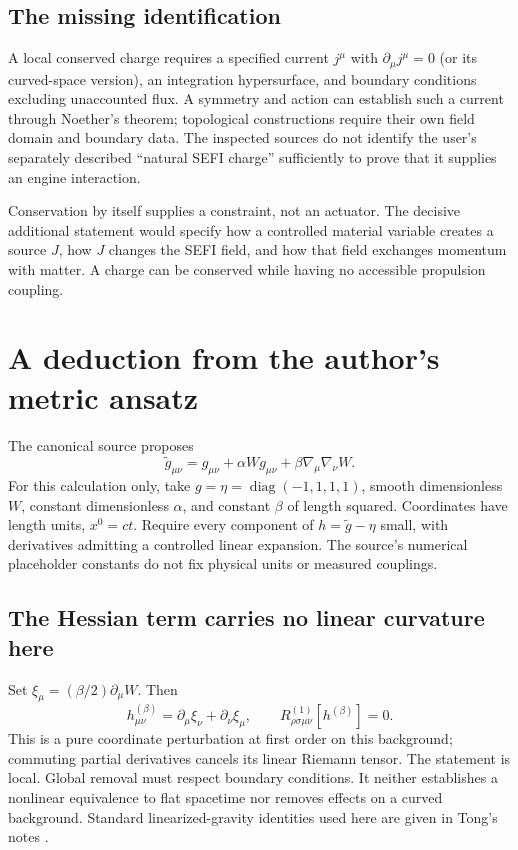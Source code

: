 \documentclass[11pt]{article}
\begin{document}
\subsection{The missing identification}
A local conserved charge requires a specified current $j^\mu$ with $\partial_\mu j^\mu=0$ (or its curved-space version), an integration hypersurface, and boundary conditions excluding unaccounted flux. A symmetry and action can establish such a current through Noether's theorem; topological constructions require their own field domain and boundary data. The inspected sources do not identify the user's separately described ``natural SEFI charge'' sufficiently to prove that it supplies an engine interaction.

Conservation by itself supplies a constraint, not an actuator. The decisive additional statement would specify how a controlled material variable creates a source $J$, how $J$ changes the SEFI field, and how that field exchanges momentum with matter. A charge can be conserved while having no accessible propulsion coupling.
\newpage
\section{A deduction from the author's metric ansatz}
The canonical source proposes
\begin{equation}
 \widetilde g_{\mu\nu}=g_{\mu\nu}+\alpha W g_{\mu\nu}
                  +\beta\nabla_\mu\nabla_\nu W.
 \label{metric}
\end{equation}
For this calculation only, take $g=\eta=\operatorname{diag}(-1,1,1,1)$, smooth dimensionless $W$, constant dimensionless $\alpha$, and constant $\beta$ of length squared. Coordinates have length units, $x^0=ct$. Require every component of $h=\widetilde g-\eta$ small, with derivatives admitting a controlled linear expansion. The source's numerical placeholder constants do not fix physical units or measured couplings.

\subsection{The Hessian term carries no linear curvature here}
Set $\xi_\mu=(\beta/2)\partial_\mu W$. Then
\begin{equation}
 h^{(\beta)}_{\mu\nu}=\partial_\mu\xi_\nu+\partial_\nu\xi_\mu,
 \qquad R^{(1)}_{\rho\sigma\mu\nu}[h^{(\beta)}]=0.
\end{equation}
This is a pure coordinate perturbation at first order on this background; commuting partial derivatives cancels its linear Riemann tensor. The statement is local. Global removal must respect boundary conditions. It neither establishes a nonlinear equivalence to flat spacetime nor removes effects on a curved background. Standard linearized-gravity identities used here are given in Tong's notes \cite{tong}.
\end{document}
